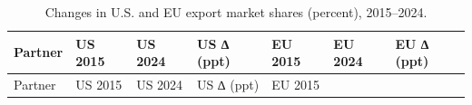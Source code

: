 \documentclass[
  manuscript=article,
  layout=publish,
  year=2026,
  volume=1,
]{den}
\begin{document}
\begin{longtable}[]{@{}
  >{\raggedright\arraybackslash}p{}
  >{\raggedleft\arraybackslash}p{}
  >{\raggedleft\arraybackslash}p{}
  >{\raggedleft\arraybackslash}p{}
  >{\raggedleft\arraybackslash}p{}
  >{\raggedleft\arraybackslash}p{}
  >{\raggedleft\arraybackslash}p{}@{}}
\caption{Changes in U.S. and EU export market shares (percent),
2015--2024.}\label{tbl-shares}\tabularnewline
\toprule\noalign{}
\begin{minipage}[b]{\linewidth}\raggedright
Partner
\end{minipage} & \begin{minipage}[b]{\linewidth}\raggedleft
US 2015
\end{minipage} & \begin{minipage}[b]{\linewidth}\raggedleft
US 2024
\end{minipage} & \begin{minipage}[b]{\linewidth}\raggedleft
US ∆ (ppt)
\end{minipage} & \begin{minipage}[b]{\linewidth}\raggedleft
EU 2015
\end{minipage} & \begin{minipage}[b]{\linewidth}\raggedleft
EU 2024
\end{minipage} & \begin{minipage}[b]{\linewidth}\raggedleft
EU ∆ (ppt)
\end{minipage} \\
\midrule\noalign{}
\endfirsthead
\toprule\noalign{}
\begin{minipage}[b]{\linewidth}\raggedright
Partner
\end{minipage} & \begin{minipage}[b]{\linewidth}\raggedleft
US 2015
\end{minipage} & \begin{minipage}[b]{\linewidth}\raggedleft
US 2024
\end{minipage} & \begin{minipage}[b]{\linewidth}\raggedleft
US ∆ (ppt)
\end{minipage} & \begin{minipage}[b]{\linewidth}\raggedleft
EU 2015
\end{minipage} & \begin{minipage}[b]{\linewidth}\raggedleft

\end{minipage}
\end{longtable}
\end{document}
